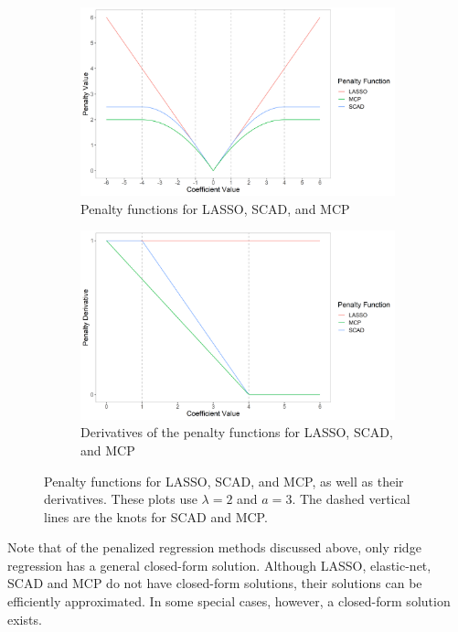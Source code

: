 \documentclass{article}
\begin{document}
\begin{figure}[!h]
	\centering
	\begin{subfigure}[b]{0.4\textwidth}
		\caption{Penalty functions for LASSO, SCAD, and MCP}
		\label{fig:penalty}
		\includegraphics[width=\textwidth]{images/lasso-scad-mcp-penalty.png}
	\end{subfigure}
	\hspace{30pt}
	\begin{subfigure}[b]{0.4\textwidth}
		\caption{Derivatives of the penalty functions for LASSO, SCAD, and MCP}
		\label{fig:derivative}
		\includegraphics[width=\textwidth]{images/lasso-scad-mcp-derivative.png}
	\end{subfigure}
	\captionsetup{width = 5in}
	\caption{Penalty functions for LASSO, SCAD, and MCP, as well as their derivatives. These plots use $\lambda = 2$ and $a = 3$. The dashed vertical lines are the knots for SCAD and MCP.}
	\label{fig:lasso-scad-mcp}
\end{figure}

Note that of the penalized regression methods discussed above, only ridge regression has a general closed-form solution. Although LASSO, elastic-net, SCAD and MCP do not have closed-form solutions, their solutions can be efficiently approximated. In some special cases, however, a closed-form solution exists. 
\end{document}
